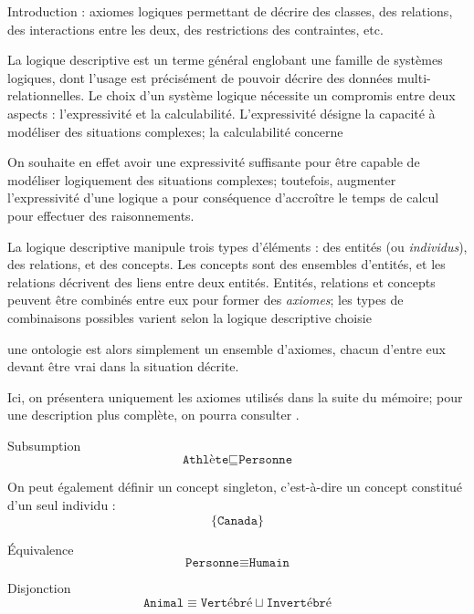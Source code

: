 Introduction : axiomes logiques permettant de décrire des classes, des relations, des interactions entre les deux, des restrictions des contraintes, etc.


La logique descriptive est un terme général englobant une famille de systèmes logiques, dont l'usage est précisément de pouvoir décrire des données multi-relationnelles. 
Le choix d'un système logique nécessite un compromis entre deux aspects : l'expressivité et la calculabilité. L'expressivité désigne la capacité à modéliser des situations complexes; la calculabilité concerne 

On souhaite en effet avoir une expressivité suffisante pour être capable de modéliser logiquement des situations complexes; toutefois, augmenter l'expressivité d'une logique a pour conséquence d'accroître le temps de calcul pour effectuer des raisonnements.


La logique descriptive manipule trois types d'éléments : des entités (ou \textit{individus}), des relations, et des concepts. Les concepts sont des ensembles d'entités, et les relations décrivent des liens entre deux entités. Entités, relations et concepts peuvent être combinés entre eux pour former des \textit{axiomes}; les types de combinaisons possibles varient selon la logique descriptive choisie

une ontologie est alors simplement un ensemble d'axiomes, chacun d'entre eux devant être vrai dans la situation décrite.

Ici, on présentera uniquement les axiomes utilisés dans la suite du mémoire; pour une description plus complète, on pourra consulter \cite{krotzsch2013description}. 

Subsumption 
\begin{equation}
    \texttt{Athlète} \sqsubseteq \texttt{Personne}
\end{equation}


On peut également définir un concept singleton, c'est-à-dire un concept constitué d'un seul individu :
\begin{equation}
    \{ \texttt{Canada} \}
\end{equation}

Équivalence
\begin{equation}
    \texttt{Personne} \equiv \texttt{Humain}
\end{equation}

Disjonction
\begin{equation}
    \texttt{Animal} \equiv \texttt{Vertébré} \sqcup \texttt{Invertébré}
\end{equation}

